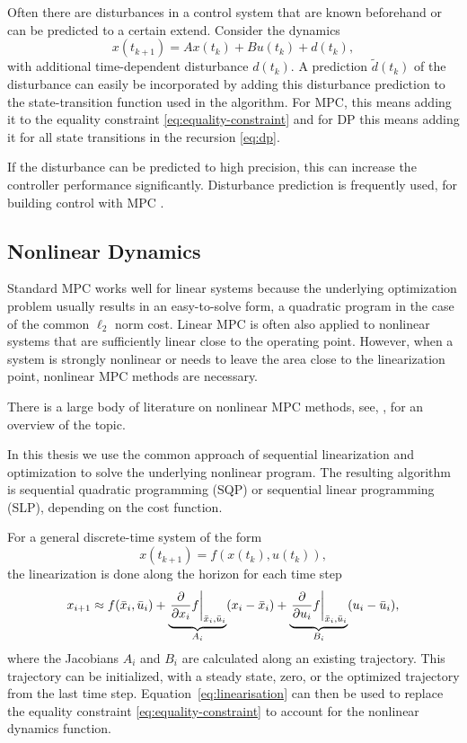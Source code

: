 Often there are disturbances in a control system that are known beforehand or
can be predicted to a certain extend. Consider the dynamics
\vspace{-\baselineskip}
\begin{equation}
  x(t_{k+1}) = A x(t_k) + B u(t_k) + d(t_k),
\end{equation}
with additional time-dependent disturbance $d(t_k)$.
A prediction $\tilde d(t_k)$ of the disturbance can easily be incorporated by
adding this disturbance prediction to the state-transition function used in the
algorithm. For MPC, this means adding it to the equality constraint
\eqref{eq:equality-constraint} and for DP this means adding it for all state
transitions in the recursion \eqref{eq:dp}.

If the disturbance can be predicted to high
precision, this can increase the controller performance significantly.
Disturbance prediction is frequently used, \eg for building control with MPC
\cite{Oldewurtel:2010:Reducing}.

\subsection{Nonlinear Dynamics}

Standard MPC works well for linear systems because the underlying optimization
problem usually results in an easy-to-solve form, \eg a quadratic program in
the case of the common $\ell_2$ norm cost. Linear MPC is often also applied to
nonlinear systems that are sufficiently linear close to the operating point.
However, when a system is strongly nonlinear or needs to leave the area close to
the linearization point, nonlinear MPC methods are necessary.

There is a large body of literature on nonlinear MPC methods, see, \eg
\cite{Kouvaritakis.Cannon:2001:Non}, \cite{Allgower.Badgwell.ea:1999:Nonlinear}
for an overview of the topic.

In this thesis we use the common approach of sequential linearization and
optimization to solve the underlying nonlinear program. The resulting
algorithm is sequential quadratic programming (SQP) or sequential linear
programming (SLP), depending on the cost function.

For a general discrete-time system of the form
\begin{equation}
  x(t_{k+1}) = f(x(t_k), u(t_k)),
\end{equation}
the linearization is done along the horizon for each time step
\begin{equation}
  \label{eq:linearisation}
  x_{i+1} \approx f(\bar x_i, \bar u_i) +
  \underbrace{\left.\frac{\de}{\de x_i} f\right|_{\bar x_i, \bar u_i}}_{A_i}
  (x_i - \bar x_i) +
  \underbrace{\left.\frac{\de}{\de u_i} f\right|_{\bar x_i, \bar u_i}}_{B_i}
  (u_i - \bar u_i),
\end{equation}
where the Jacobians $A_i$ and $B_i$ are calculated along an existing trajectory.
This trajectory can be initialized, \eg with a steady state, zero, or the
optimized trajectory from the last time step. Equation~\eqref{eq:linearisation}
can then be used to replace the equality constraint
\eqref{eq:equality-constraint} to account for the nonlinear dynamics function.

